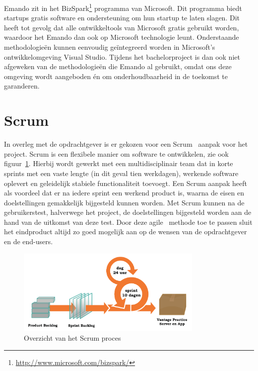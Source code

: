 

Emando zit in het BizSpark\footnote{\url{http://www.microsoft.com/bizspark/}} programma van Microsoft. Dit programma biedt startups gratis software en ondersteuning om hun startup te laten slagen. Dit heeft tot gevolg dat alle ontwikkeltools van Microsoft gratis gebruikt worden, waardoor het Emando dan ook op Microsoft technologie leunt. Onderstaande methodologieën kunnen eenvoudig geïntegreerd worden in Microsoft's ontwikkelomgeving Visual Studio. Tijdens het bachelorproject is dan ook niet afgeweken van de methodologieën die Emando al gebruikt, omdat ons deze omgeving wordt aangeboden én om onderhoudbaarheid in de toekomst te garanderen.

\section{Scrum}
In overleg met de opdrachtgever is er gekozen voor een Scrum~\cite{schwaber2002gile} aanpak voor het project. Scrum is een flexibele manier om software te ontwikkelen, zie ook figuur~\ref{fig:scrum-proces}. Hierbij wordt gewerkt met een multidisciplinair team dat in korte sprints met een vaste lengte (in dit geval tien werkdagen), werkende software oplevert en geleidelijk stabiele functionaliteit toevoegt. Een Scrum aanpak heeft als voordeel dat er na iedere sprint een werkend product is, waarna de eisen en doelstellingen gemakkelijk bijgesteld kunnen worden. Met Scrum kunnen na de gebruikerstest, halverwege het project, de doelstellingen bijgesteld worden aan de hand van de uitkomst van deze test. Door deze agile~\cite{fowler2001agile} methode toe te passen sluit het eindproduct altijd zo goed mogelijk aan op de wensen van de opdrachtgever en de end-users.

\begin{figure}[H]
  \begin{center}
    \includegraphics[width=0.8\textwidth]{style/images/Scrum}
  \end{center}
  \caption{Overzicht van het Scrum proces}
  \label{fig:scrum-proces}
\end{figure}

